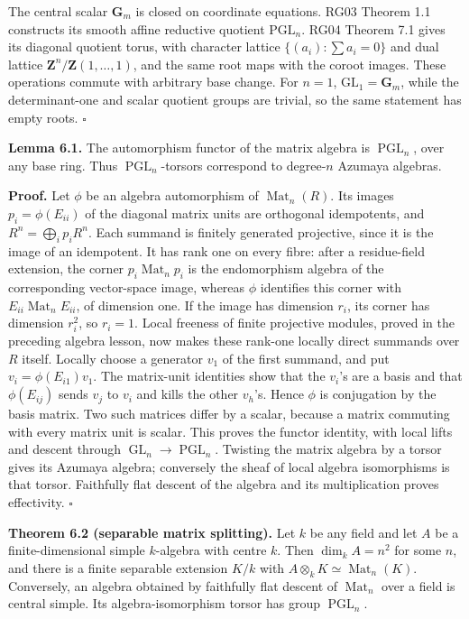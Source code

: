 \documentclass[11pt,a4paper,openany]{report}
\begin{document}
The central scalar \(\mathbf G_m\) is closed on coordinate equations. RG03 Theorem 1.1 constructs its smooth affine reductive quotient \(\mathrm{PGL}_n\). RG04 Theorem 7.1 gives its diagonal quotient torus, with character lattice \(\{(a_i):\sum a_i=0\}\) and dual lattice \(\mathbf Z^n/\mathbf Z(1,\ldots,1)\), and the same root maps with the coroot images. These operations commute with arbitrary base change. For \(n=1\), \(\mathrm{GL}_1=\mathbf G_m\), while the determinant-one and scalar quotient groups are trivial, so the same statement has empty roots. \(\square\)

\textbf{Lemma 6.1.} The automorphism functor of the matrix algebra is \(\operatorname{PGL}_n\), over any base ring. Thus \(\operatorname{PGL}_n\)-torsors correspond to degree-\(n\) Azumaya algebras.

\textbf{Proof.} Let \(\phi\) be an algebra automorphism of \(\operatorname{Mat}_n(R)\). Its images \(p_i=\phi(E_{ii})\) of the diagonal matrix units are orthogonal idempotents, and \(R^n=\bigoplus_i p_iR^n\). Each summand is finitely generated projective, since it is the image of an idempotent. It has rank one on every fibre: after a residue-field extension, the corner \(p_i\operatorname{Mat}_n p_i\) is the endomorphism algebra of the corresponding vector-space image, whereas \(\phi\) identifies this corner with \(E_{ii}\operatorname{Mat}_n E_{ii}\), of dimension one. If the image has dimension \(r_i\), its corner has dimension \(r_i^2\), so \(r_i=1\). Local freeness of finite projective modules, proved in the preceding algebra lesson, now makes these rank-one locally direct summands over \(R\) itself. Locally choose a generator \(v_1\) of the first summand, and put \(v_i=\phi(E_{i1})v_1\). The matrix-unit identities show that the \(v_i\)'s are a basis and that \(\phi(E_{ij})\) sends \(v_j\) to \(v_i\) and kills the other \(v_h\)'s. Hence \(\phi\) is conjugation by the basis matrix. Two such matrices differ by a scalar, because a matrix commuting with every matrix unit is scalar. This proves the functor identity, with local lifts and descent through \(\operatorname{GL}_n\to\operatorname{PGL}_n\). Twisting the matrix algebra by a torsor gives its Azumaya algebra; conversely the sheaf of local algebra isomorphisms is that torsor. Faithfully flat descent of the algebra and its multiplication proves effectivity. \(\square\)

\textbf{Theorem 6.2 (separable matrix splitting).} Let \(k\) be any field and let \(A\) be a finite-dimensional simple \(k\)-algebra with centre \(k\). Then \(\dim_k A=n^2\) for some \(n\), and there is a finite separable extension \(K/k\) with \(A\otimes_k K\simeq\operatorname{Mat}_n(K)\). Conversely, an algebra obtained by faithfully flat descent of \(\operatorname{Mat}_n\) over a field is central simple. Its algebra-isomorphism torsor has group \(\operatorname{PGL}_n\).
\end{document}
